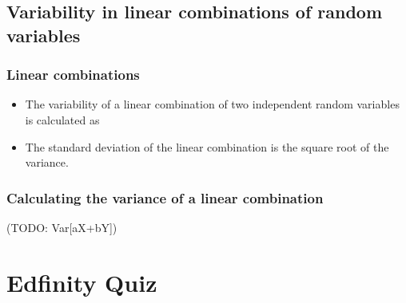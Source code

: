 \documentclass[slidestop,compress,mathserif]{beamer}
\newcommand{\soln}[1]{\textit{#1}}
\begin{document}
\subsection{Variability in linear combinations of random variables}


\begin{frame}
\frametitle{Linear combinations}

\begin{itemize}

\item The variability of a linear combination of two independent random variables is calculated as
\formula{\[ V(aX + bY) = a^2 \times V(X) + b^2 \times V(Y) \]}

\pause 

\item The standard deviation of the linear combination is the square root of the variance.

\end{itemize}

\pause 
\vfill


\end{frame}


\begin{frame}
\frametitle{Calculating the variance of a linear combination}

(TODO: Var[aX+bY])



\end{frame}


\section{Edfinity Quiz}




\end{document}
